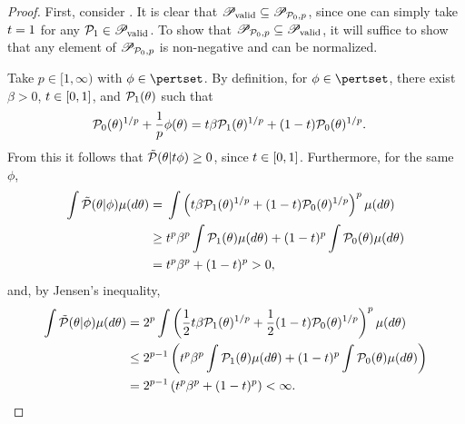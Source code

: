\begin{proof}
%
First, consider . It is clear that
$\mathscr{P}_{\mathrm{valid}} \subseteq \mathscr{P}_{\mathcal{P}_{0},p}$, since one can
simply take $t = 1$ for any $\mathcal{P}_{1} \in \mathscr{P}_{\mathrm{valid}}$.  To show
that $\mathscr{P}_{\mathcal{P}_{0},p} \subseteq \mathscr{P}_{\mathrm{valid}}$, it will
suffice to show that any element of $\mathscr{P}_{\mathcal{P}_{0},p}$ is non-negative and
can be normalized.

Take $p \in [1, \infty)$ with $\phi \in \pertset$.  By definition, for $\phi \in
\pertset$, there exist $\beta > 0$, $t \in [0,1]$, and $\mathcal{P}_{1}(\theta)$ such
that
%
\begin{align*}
%
\pbase(\theta)^{1/p} + \frac{1}{p} \phi(\theta) ={}&
    \t \beta \palt(\theta)^{1/p} + (1- \t) \pbase(\theta)^{1/p}.
%
\end{align*}
%
From this it follows that $\tilde{\mathcal{P}}(\theta \vert t \phi) \ge 0$, since $t \in
[0,1]$.  Furthermore, for the same $\phi$,
%
\begin{align*}
%
\int \ptil(\theta \vert \phi) \mu(d\theta) ={}&
\int \left(\t \beta \palt(\theta)^{1/p} +
           (1- \t) \pbase(\theta)^{1/p} \right)^{p} \mu(d\theta)
\\\ge{}&
\t^p \beta^p \int \palt(\theta) \mu(d\theta) +
    (1- \t)^p \int \pbase(\theta) \mu(d\theta)
\\={}& \t^p \beta^p + (1- \t)^p > 0,
%
\end{align*}
%
and, by Jensen's inequality,
%
\begin{align*}
%
\int \ptil(\theta \vert \phi) \mu(d\theta) ={}&
2^p \int \left(\frac{1}{2} \t \beta \palt(\theta)^{1/p} +
           \frac{1}{2} (1- \t) \pbase(\theta)^{1/p} \right)^{p} \mu(d\theta)
\\\le{}&
%
2^{p-1} \left(
    \t^p \beta^p \int \palt(\theta) \mu(d\theta) +
    (1- \t)^p \int  \pbase(\theta)\mu(d\theta)
\right)
\\={}& 2^{p-1} \left( \t^p \beta^p + (1- \t)^p\right) < \infty.
%
\end{align*}


\end{proof}
